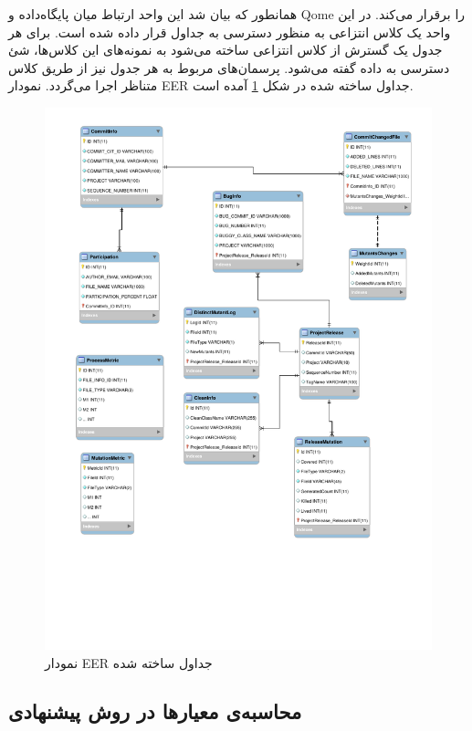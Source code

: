همانطور که بیان شد این واحد ارتباط میان پایگاه‌داده و Qome را برقرار می‌کند. در این واحد یک کلاس انتزاعی به منظور دسترسی به جداول قرار داده شده است.  برای هر جدول یک گسترش از کلاس انتزاعی ساخته می‌شود  به نمونه‌های این کلاس‌ها، شئ دسترسی به داده  گفته می‌شود. پرسمان‌های مربوط به هر جدول  نیز از طریق کلاس متناظر اجرا می‌گردد. نمودار EER جداول ساخته شده در شکل \ref{fig:EER} آمده است.
\begin{figure}[H]
	\centering
	\includegraphics[trim={0 5cm 0 0},width=1\textwidth]{img/method/EER.pdf}
	\caption{ نمودار EER جداول ساخته شده}
	\label{fig:EER}
\end{figure}

\subsection{محاسبه‌ی معیارها در روش پیشنهادی}


